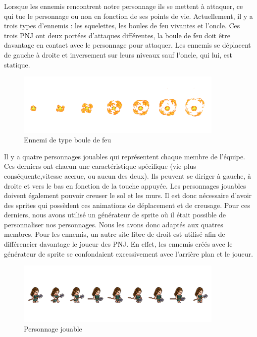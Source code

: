 \documentclass[a4paper,12pt]{article}
\begin{document}
Lorsque les ennemis rencontrent notre personnage ils se mettent à attaquer, ce qui tue le personnage ou non en fonction de ses points de vie. 
Actuellement, il y a trois types d’ennemis : les squelettes, les boules de feu vivantes et l'oncle. 
Ces trois PNJ ont deux portées d’attaques différentes, la boule de feu doit être davantage en contact avec le personnage pour attaquer.
Les ennemis se déplacent de gauche à droite et inversement sur leurs niveaux sauf l'oncle, qui lui, est statique. 

\begin{figure}[h]
	\centering
	\includegraphics[height=3cm]{img/exemple_feu.png}
	\caption{Ennemi de type boule de feu}
	\label{boule de feu}
\end{figure}

Il y a quatre personnages jouables qui représentent chaque membre de l’équipe. 
Ces derniers ont chacun une caractéristique spécifique (vie plus conséquente,vitesse accrue, ou aucun des deux). 
Ils peuvent se diriger à gauche, à droite et vers le bas en fonction de la touche appuyée. 
Les personnages jouables doivent également pouvoir creuser le sol et les murs. Il est donc nécessaire d’avoir des sprites qui possèdent ces animations de déplacement et de creusage.
Pour ces derniers, nous avons utilisé un générateur de sprite où il était possible de personnaliser nos personnages. Nous les avons donc adaptés aux quatres membres. 
Pour les ennemis, un autre site libre de droit est utilisé afin de différencier davantage le joueur des PNJ. En effet, les ennemis créés avec le générateur de sprite se confondaient excessivement avec l'arrière plan et le joueur.

\begin{figure}[h]
	\centering
	\includegraphics[height=3cm]{img/exemple_personnage_jouable.png}
	\caption{Personnage jouable}
	\label{personnage jouable}
\end{figure}
\end{document}
